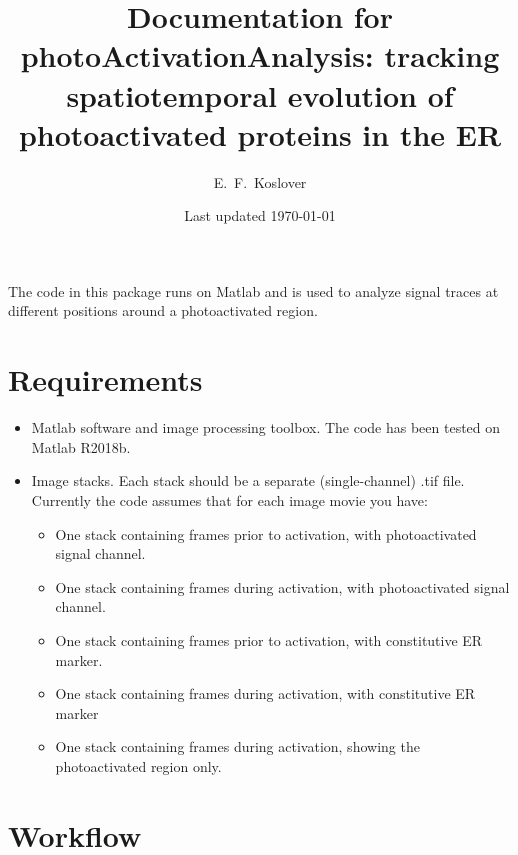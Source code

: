 \documentclass[12pt]{article}
\begin{document}
\title{\vspace{-2cm}Documentation for photoActivationAnalysis: tracking spatiotemporal evolution of photoactivated proteins in the ER}
\author{E.~F.~Koslover}
\date{Last updated \today}
\maketitle

The code in this package runs on Matlab and is used to analyze signal traces at different positions around a photoactivated region. 


\section{Requirements}
\begin{itemize}
	\item Matlab software and image processing toolbox. The code has been tested on Matlab R2018b.
	\item Image stacks. Each stack should be a separate (single-channel) .tif file. Currently the code assumes that for each image movie you have:
	\begin{itemize}
		\item One stack containing frames prior to activation, with photoactivated signal channel.
		\item One stack containing frames during activation, with photoactivated signal channel.
		\item One stack containing frames prior to activation, with constitutive ER marker.
		\item One stack containing frames during activation, with constitutive ER marker
		\item One stack containing frames during activation, showing the photoactivated region only.
	\end{itemize}
\end{itemize}

\section{Workflow}
	
\end{document}
